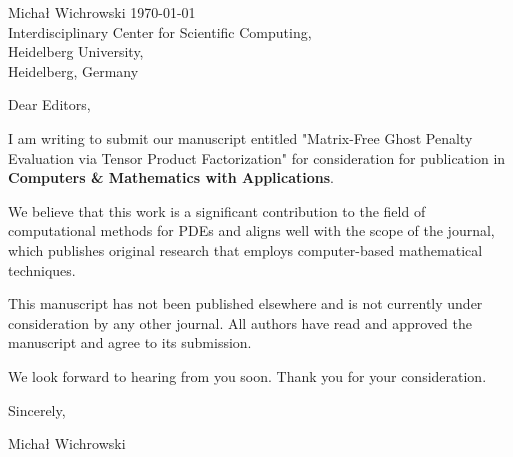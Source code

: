 \documentclass{article}
\begin{document}
\noindent Michał Wichrowski \hfill \today\\
Interdisciplinary Center for Scientific Computing,\\
Heidelberg University,\\
Heidelberg, Germany
\bigskip

\bigskip

\bigskip

\noindent Dear Editors,

\noindent I am writing to submit our manuscript entitled "Matrix-Free Ghost Penalty Evaluation via Tensor Product
Factorization" for consideration for publication in \textbf{Computers \& Mathematics with Applications}.

We believe that this work is a significant contribution to the field of computational methods for PDEs and
aligns well with the scope of the journal, which publishes original research that
employs computer-based mathematical techniques.

This manuscript has not been published elsewhere and is not currently under consideration by any other
journal. All authors have read and approved the manuscript and agree to its submission.

\noindent We look forward to hearing from you soon. Thank you for your consideration.

\bigskip

\hfill	 Sincerely, \hspace{5em}

\hfill Michał Wichrowski \hspace{5 em}
\end{document}
